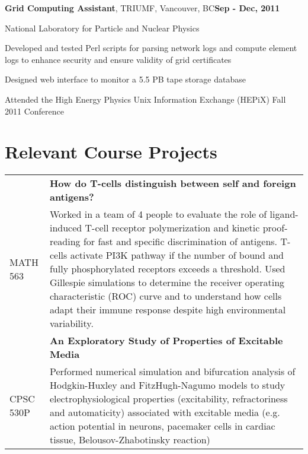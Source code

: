 \documentclass[margin,line]{res}
\newenvironment{list1}{
  \begin{list}{\ding{113}}{
      \setlength{\itemsep}{0in}
      \setlength{\parsep}{0in} \setlength{\parskip}{0in}
      \setlength{\topsep}{0in} \setlength{\partopsep}{0in} 
      \setlength{\leftmargin}{0.17in}}}{\end{list}}
\newenvironment{list3}{
  \begin{list}{\textopenbullet}{
      \setlength{\itemsep}{0in}
      \setlength{\parsep}{0in} \setlength{\parskip}{0in}
      \setlength{\topsep}{0in} \setlength{\partopsep}{0in} 
      \setlength{\leftmargin}{0.1in}}}{\end{list}}
\begin{document}
\begin{resume}
{\bf Grid Computing Assistant}, TRIUMF, Vancouver, BC\hfill{\bf Sep - Dec, 2011}\\
\vspace*{-.2cm}
\begin{list1}
\item[] National Laboratory for Particle and Nuclear Physics
\vspace*{.2cm}
\begin{list3}
\setlength\itemsep{0.5em}
\item Developed and tested Perl scripts for parsing network logs and compute element logs to enhance security and ensure validity of grid certificates
\item Designed web interface to monitor a 5.5 PB tape storage database
\item Attended the High Energy Physics Unix Information Exchange (HEPiX) Fall 2011 Conference
\end{list3}
\end{list1}

\vspace*{.4cm}

\section{\sc Relevant Course Projects}

\begin{tabular}{@{}p{1.6cm}p{13.6cm}}
&{\bf How do T-cells distinguish between self and foreign antigens?}\\
MATH 563&Worked in a team of 4 people to evaluate the role of ligand-induced T-cell receptor polymerization and kinetic proof-reading for fast and specific discrimination of antigens. T-cells activate PI3K pathway if the number of bound and fully phosphorylated receptors exceeds a threshold. Used Gillespie simulations to determine the receiver operating characteristic (ROC) curve and to understand how cells adapt their immune response despite high environmental variability.\\[5pt]

&{\bf An Exploratory Study of Properties of Excitable Media}\\
CPSC 530P&Performed numerical simulation and bifurcation analysis of Hodgkin-Huxley and FitzHugh-Nagumo models to study electrophysiological properties (excitability, refractoriness and automaticity) associated with excitable media (e.g. action potential in neurons, pacemaker cells in cardiac tissue, Belousov-Zhabotinsky reaction)\\
\end{tabular}


\end{resume}
\end{document}
